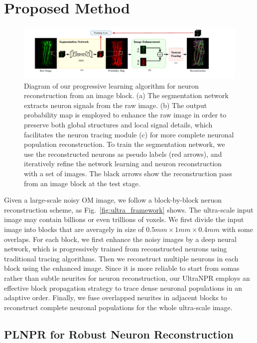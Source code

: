 \section{Proposed Method}
\label{sec:method}
\begin{figure}[th]
	\centering
	\includegraphics[width=1\textwidth]{./Illustrations/framework_plnpr.pdf}
	\caption{Diagram of our progressive learning algorithm for neuron reconstruction from an image block. (a) The segmentation network extracts neuron signals from the raw image. (b) The output probability map is employed to enhance the raw image in order to preserve both global structures and local signal details, which facilitates the neuron tracing module (c) for more complete neuronal population reconstruction. To train the segmentation network, we use the reconstructed neurons as pseudo labels (red arrows), and iteratively refine the network learning and neuron reconstruction with a set of images. The black arrows show the reconstruction pass from an image block at the test stage.}
	\label{fig:framework}
\end{figure}


Given a large-scale noisy OM image, we follow a block-by-block neruon reconstruction scheme, as Fig.~\ref{fig:ultra_framework} shows. 
%
The ultra-scale input image may contain billions or even trillions of voxels.
We first divide the input image into blocks that are averagely in size of $0.5mm\times 1mm\times 0.4mm$ with some overlaps. 
%
For each block, we first enhance the noisy images by a deep neural network, which is progressively trained from reconstructed neurons using traditional tracing algorithms. 
Then we reconstruct multiple neurons in each block using the enhanced image. 
%
Since it is more reliable to start from somas rather than subtle neurites for neuron reconstruction, our UltraNPR employs an effective block propagation strategy to trace dense neuronal populations in an adaptive order. 
Finally, we fuse overlapped neurites in adjacent blocks to reconstruct complete neuronal populations for the whole ultra-scale image.

\subsection{PLNPR for Robust Neuron Reconstruction}
\label{sec:PLNPR}



